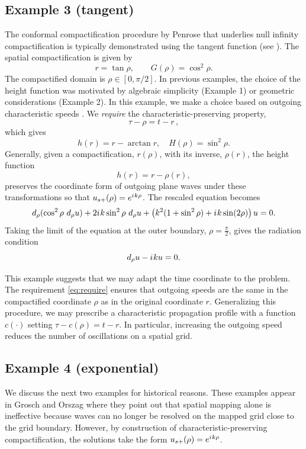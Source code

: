\documentclass[onefignum,onetabnum]{siamart190516}
\newcommand{\be}{\begin{equation}}
\newcommand{\ee}{\end{equation}}
\newcommand{\iu}{{i\mkern1mu}}
\begin{document}
\subsection{Example 3 (tangent)}\label{sec:tan}
The conformal compactification procedure by Penrose \cite{Penrose, Penrose65} that underlies null infinity compactification is typically demonstrated using the tangent function (see \cite{penrose2011republication}). The spatial compactification is given by
\be\label{eq:ex3_mapping} r = \tan \rho, \qquad G(\rho) = \cos^2\rho. \ee
The compactified domain is $\rho\in[0,\pi/2]$. In previous examples, the choice of the height function was motivated by algebraic simplicity (Example 1) or geometric considerations (Example 2). In this example, we make a choice based on outgoing characteristic speeds \cite{ZENGINOGLU20112286, bernuzzi2011binary, zenginouglu2025bridging}. We \emph{require} the characteristic-preserving property,
\be\label{eq:require} \tau - \rho = t - r\,,\ee
which gives
\[ h(r) = r - \arctan r, \quad H(\rho) = \sin^2\rho. \]
Generally, given a compactification, $r(\rho)$, with its inverse, $\rho(r)$, the height function
\be\label{eq:invariant} 
h(r) = r - \rho(r),
\ee 
preserves the coordinate form of outgoing plane waves under these transformations so that $u_{s+}(\rho) = e^{\iu k \rho}$. The rescaled equation becomes
\be\label{eq:transformed} d_\rho(\cos^2 \rho \ d_\rho u ) + 2\iu k \sin^2\rho \ d_\rho u + \left(k^2 (1+\sin^2\rho)+\iu k \sin(2\rho) \right) u = 0. \ee
Taking the limit of the equation at the outer boundary, $\rho=\frac{\pi}{2}$, gives the radiation condition
\[ d_\rho u - \iu k u = 0. \]

This example suggests that we may adapt the time coordinate to the problem. The requirement \eqref{eq:require} ensures that outgoing speeds are the same in the compactified coordinate $\rho$ as in the original coordinate $r$. Generalizing this procedure, we may prescribe a characteristic propagation profile with a function $c(\cdot)$ setting $\tau - c(\rho) = t - r$. In particular, increasing the outgoing speed reduces the number of oscillations on a spatial grid. 

\subsection{Example 4 (exponential)}\label{sec:exp}
We discuss the next two examples for historical reasons. These examples appear in Grosch and Orszag \cite{GroschOrszag77} where they point out that spatial mapping alone is ineffective because waves can no longer be resolved on the mapped grid close to the grid boundary. However, by construction of characteristic-preserving compactification, the solutions take the form $u_{s+}(\rho) = e^{\iu k \rho}$. 
\end{document}
